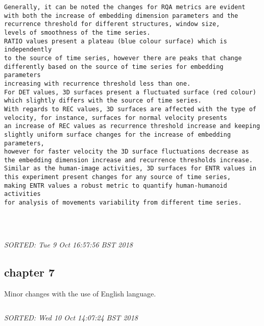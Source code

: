 \documentclass[10pt]{article}
\begin{document}
\begin{enumerate}
\begin{verbatim}
Generally, it can be noted the changes for RQA metrics are evident
with both the increase of embedding dimension parameters and the 
recurrence threshold for different structures, window size, 
levels of smoothness of the time series. 
RATIO values present a plateau (blue colour surface) which is independently 
to the source of time series, however there are peaks that change 
differently based on the source of time series for embedding parameters 
increasing with recurrence threshold less than one.
For DET values, 3D surfaces present a fluctuated surface (red colour)
which slightly differs with the source of time series.
With regards to REC values, 3D surfaces are affected with the type of 
velocity, for instance, surfaces for normal velocity presents 
an increase of REC values as recurrence threshold increase and keeping 
slightly uniform surface changes for the increase of embedding parameters, 
however for faster velocity the 3D surface fluctuations decrease as 
the embedding dimension increase and recurrence thresholds increase.
Similar as the human-image activities, 3D surfaces for ENTR values in 
this experiment present changes for any source of time series,
making ENTR values a robust metric to quantify human-humanoid activities 
for analysis of movements variability from different time series.




\end{verbatim}
\textit{
SORTED: 
Tue  9 Oct 16:57:56 BST 2018
}
\\




\end{enumerate}


\subsection{chapter 7}
Minor changes with the use of English language.
\begin{verbatim}

\end{verbatim}
\textit{
SORTED: 
Wed 10 Oct 14:07:24 BST 2018
}
\\
\end{document}
